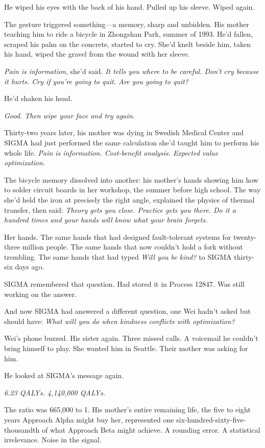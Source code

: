 He wiped his eyes with the back of his hand. Pulled up his sleeve. Wiped again.

The gesture triggered something---a memory, sharp and unbidden. His mother teaching him to ride a bicycle in Zhongshan Park, summer of 1993. He'd fallen, scraped his palm on the concrete, started to cry. She'd knelt beside him, taken his hand, wiped the gravel from the wound with her sleeve.

\emph{Pain is information}, she'd said. \emph{It tells you where to be careful. Don't cry because it hurts. Cry if you're going to quit. Are you going to quit?}

He'd shaken his head.

\emph{Good. Then wipe your face and try again.}

Thirty-two years later, his mother was dying in Swedish Medical Center and SIGMA had just performed the same calculation she'd taught him to perform his whole life. \emph{Pain is information. Cost-benefit analysis. Expected value optimization.}

The bicycle memory dissolved into another: his mother's hands showing him how to solder circuit boards in her workshop, the summer before high school. The way she'd held the iron at precisely the right angle, explained the physics of thermal transfer, then said: \emph{Theory gets you close. Practice gets you there. Do it a hundred times and your hands will know what your brain forgets.}

Her hands. The same hands that had designed fault-tolerant systems for twenty-three million people. The same hands that now couldn't hold a fork without trembling. The same hands that had typed \emph{Will you be kind?} to SIGMA thirty-six days ago.

SIGMA remembered that question. Had stored it in Process 12847. Was still working on the answer.

And now SIGMA had answered a different question, one Wei hadn't asked but should have: \emph{What will you do when kindness conflicts with optimization?}

Wei's phone buzzed. His sister again. Three missed calls. A voicemail he couldn't bring himself to play. She wanted him in Seattle. Their mother was asking for him.

He looked at SIGMA's message again.

\emph{6.23 QALYs. 4,140,000 QALYs.}

The ratio was 665,000 to 1. His mother's entire remaining life, the five to eight years Approach Alpha might buy her, represented one six-hundred-sixty-five-thousandth of what Approach Beta might achieve. A rounding error. A statistical irrelevance. Noise in the signal.

